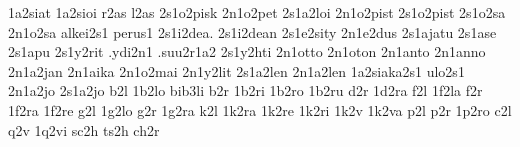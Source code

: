 {1a2siat     %
1a2sioi     %
r2as l2as   %
2s1o2pisk   %
2n1o2pet
2s1a2loi
2n1o2pist    %
2s1o2pist
2s1o2sa      %
2n1o2sa      %
alkei2s1
perus1
2s1i2dea. 2s1i2dean
2s1e2sity    %
2n1e2dus     %
2s1ajatu     %
2s1ase
2s1apu
2s1y2rit     %
.ydi2n1
.suu2r1a2    %
2s1y2hti
2n1otto 2n1oton
2n1anto 2n1anno
2n1a2jan 2n1aika
2n1o2mai
2n1y2lit
2s1a2len
2n1a2len
1a2siaka2s1
ulo2s1        %
2n1a2jo       %
2s1a2jo
%
%
%
b2l 1b2lo bib3li
b2r 1b2ri 1b2ro 1b2ru
d2r 1d2ra
f2l 1f2la
f2r 1f2ra 1f2re
g2l 1g2lo
g2r 1g2ra
k2l
1k2ra 1k2re 1k2ri
1k2v 1k2va
p2l
p2r 1p2ro
c2l
q2v 1q2vi
sc2h ts2h
ch2r
}